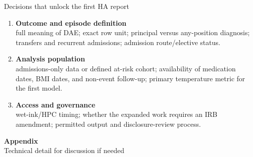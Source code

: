 \documentclass[aspectratio=169,10pt]{beamer}
\begin{document}
\begin{frame}{Decisions that unlock the first HA report}
  \footnotesize
  \begin{enumerate}
    \item \textbf{Outcome and episode definition}\\[0.1em]
      full meaning of DAE; exact row unit; principal versus any-position diagnosis;
      transfers and recurrent admissions; admission route/elective status.

    \vspace{0.3em}
    \item \textbf{Analysis population}\\[0.1em]
      admissions-only data or defined at-risk cohort;
      availability of medication dates, BMI dates, and non-event follow-up;
      primary temperature metric for the first model.

    \vspace{0.3em}
    \item \textbf{Access and governance}\\[0.1em]
      wet-ink/HPC timing; whether the expanded work requires an IRB amendment;
      permitted output and disclosure-review process.
  \end{enumerate}

  \vspace{0.4em}
\end{frame}

\appendix
\begin{frame}[plain]
  \centering
  \vspace{2.4cm}
  {\color{LaidlawNavy}\Large\bfseries Appendix}\\[0.55em]
  {\normalsize Technical detail for discussion if needed}
\end{frame}
\end{document}
